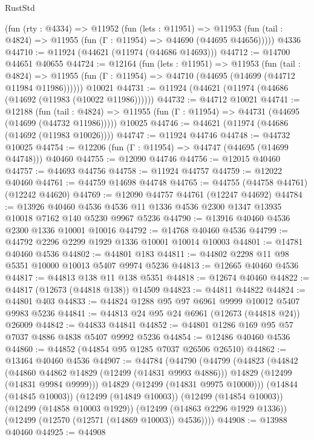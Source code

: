 \begin{lexlean}{RustStd}
\begin{coremodule}
{\begin{coremodule}
{{{{{{{{{{{{{{{{{{{{{{{{{{{{{{{{{{{{{{{{{{{{{{{{{{{{{{{{{{{{{{{{{{{{{{{{{{{{{{{{    (fun (rty : @4334) =>
    @11952
      (fun (lets : @11951) =>
      @11953 (fun (tail : @4824) => @11955 (fun (Γ : @11954) => @44690 (@44695 @44656)))))
    @4336
@44710 := @11924 (@44621 (@11974 (@44686 @14693)))
@44712 := @14700 @44651 @40655
@44724 := @12164
    (fun (lets : @11951) =>
    @11953
      (fun (tail : @4824) =>
      @11955 (fun (Γ : @11954) => @44710 (@44695 (@14699 (@44712 @11984 @11986))))))
    @10021
@44731 := @11924 (@44621 (@11974 (@44686 (@14692 (@11983 (@10022 @11986))))))
@44732 := @44712 @10021
@44741 := @12188
    (fun (tail : @4824) => @11955 (fun (Γ : @11954) => @44731 (@44695 (@14699 (@44732 @11986)))))
    @10025
@44746 := @44621 (@11974 (@44686 (@14692 (@11983 @10026))))
@44747 := @11924 @44746
@44748 := @44732 @10025
@44754 := @12206 (fun (Γ : @11954) => @44747 (@44695 (@14699 @44748))) @40460
@44755 := @12090 @44746
@44756 := @12015 @40460
@44757 := @44693 @44756
@44758 := @11924 @44757
@44759 := @12022 @40460
@44761 := @44759 @14698 @44748
@44765 := @44755 (@44758 @44761) (@12242 @44620)
@44769 := @12090 @44757 @44761 (@12247 @44692)
@44784 := @13926
    @40460
    @4536
    @4536
    @11
    @1336
    @4536
    @2300
    @1347
    @13935
    @10018
    @7162
    @140
    @5230
    @9967
    @5236
@44790 := @13916 @40460 @4536 @2300 @1336 @10001 @10016
@44792 := @14768 @40460 @4536
@44799 := @44792 @2296 @2299 @1929 @1336 @10001 @10014 @10003
@44801 := @14781 @40460 @4536
@44802 := @44801 @183
@44811 := @44802 @2298 @11 @98 @5351 @10000 @10013 @5407 @9974 @5236
@44813 := @12665 @40460 @4536
@44817 := @44813 @138 @11 @138 @5351
@44818 := @12674 @40460
@44822 := @44817 (@12673 (@44818 @138)) @14509
@44823 := @44811 @44822
@44824 := @44801 @403
@44833 := @44824 @1288 @95 @97 @6961 @9999 @10012 @5407 @9983 @5236
@44841 := @44813 @24 @95 @24 @6961 (@12673 (@44818 @24)) @26009
@44842 := @44833 @44841
@44852 := @44801 @1286 @169 @95 @57 @7037 @4886 @4838 @5407 @9992 @5236
@44854 := @12486 @40460 @4536
@44860 := @44852 (@44854 @95 @1285 @7037 @26506 @26510)
@44862 := @13464 @40460 @4536
@44907 := @44784
    (@44790
      (@44799
        (@44823
          (@44842
            (@44860 @44862 @14829 (@12499 (@14831 @9993 @4886)))
            @14829
            (@12499 (@14831 @9984 @9999)))
          @14829
          (@12499 (@14831 @9975 @10000)))
        (@14844 (@14845 @10003))
        (@12499 (@14849 @10003))
        (@12499 (@14854 @10003))
        (@12499 (@14858 @10003 @1929))
        (@12499 (@14863 @2296 @1929 @1336))
        (@12499 (@12570 (@12571 (@14869 @10003)) @4536))))
@44908 := @13988 @40460
@44925 := @44908
}}}}}}}}}}}}}}}}}}}}}}}}}}}}}}}}}}}}}}}}}}}}}}}}}}}}}}}}}}}}}}}}}}}}}}}}}}}}}}}}
\end{coremodule}}
\end{coremodule}
\end{lexlean}
